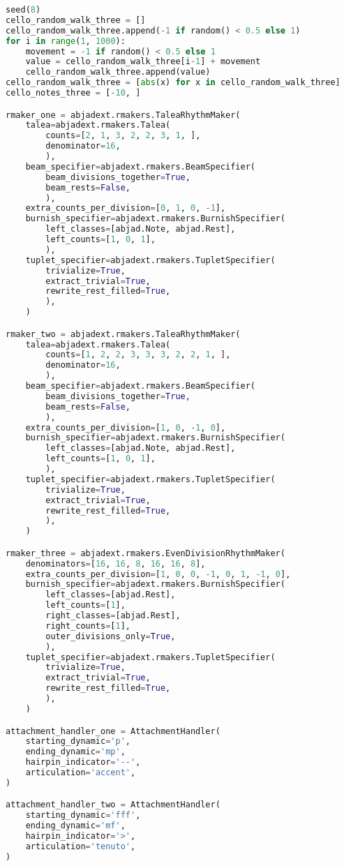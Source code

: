 \begin{lstlisting}[language=Python, caption=Four Ages of Sand Segment\_III]
seed(8)
cello_random_walk_three = []
cello_random_walk_three.append(-1 if random() < 0.5 else 1)
for i in range(1, 1000):
    movement = -1 if random() < 0.5 else 1
    value = cello_random_walk_three[i-1] + movement
    cello_random_walk_three.append(value)
cello_random_walk_three = [abs(x) for x in cello_random_walk_three]
cello_notes_three = [-10, ]

rmaker_one = abjadext.rmakers.TaleaRhythmMaker(
    talea=abjadext.rmakers.Talea(
        counts=[2, 1, 3, 2, 2, 3, 1, ],
        denominator=16,
        ),
    beam_specifier=abjadext.rmakers.BeamSpecifier(
        beam_divisions_together=True,
        beam_rests=False,
        ),
    extra_counts_per_division=[0, 1, 0, -1],
    burnish_specifier=abjadext.rmakers.BurnishSpecifier(
        left_classes=[abjad.Note, abjad.Rest],
        left_counts=[1, 0, 1],
        ),
    tuplet_specifier=abjadext.rmakers.TupletSpecifier(
        trivialize=True,
        extract_trivial=True,
        rewrite_rest_filled=True,
        ),
    )

rmaker_two = abjadext.rmakers.TaleaRhythmMaker(
    talea=abjadext.rmakers.Talea(
        counts=[1, 2, 2, 3, 3, 3, 2, 2, 1, ],
        denominator=16,
        ),
    beam_specifier=abjadext.rmakers.BeamSpecifier(
        beam_divisions_together=True,
        beam_rests=False,
        ),
    extra_counts_per_division=[1, 0, -1, 0],
    burnish_specifier=abjadext.rmakers.BurnishSpecifier(
        left_classes=[abjad.Note, abjad.Rest],
        left_counts=[1, 0, 1],
        ),
    tuplet_specifier=abjadext.rmakers.TupletSpecifier(
        trivialize=True,
        extract_trivial=True,
        rewrite_rest_filled=True,
        ),
    )

rmaker_three = abjadext.rmakers.EvenDivisionRhythmMaker(
    denominators=[16, 16, 8, 16, 16, 8],
    extra_counts_per_division=[1, 0, 0, -1, 0, 1, -1, 0],
    burnish_specifier=abjadext.rmakers.BurnishSpecifier(
        left_classes=[abjad.Rest],
        left_counts=[1],
        right_classes=[abjad.Rest],
        right_counts=[1],
        outer_divisions_only=True,
        ),
    tuplet_specifier=abjadext.rmakers.TupletSpecifier(
        trivialize=True,
        extract_trivial=True,
        rewrite_rest_filled=True,
        ),
    )

attachment_handler_one = AttachmentHandler(
    starting_dynamic='p',
    ending_dynamic='mp',
    hairpin_indicator='--',
    articulation='accent',
)

attachment_handler_two = AttachmentHandler(
    starting_dynamic='fff',
    ending_dynamic='mf',
    hairpin_indicator='>',
    articulation='tenuto',
)


\end{lstlisting}
